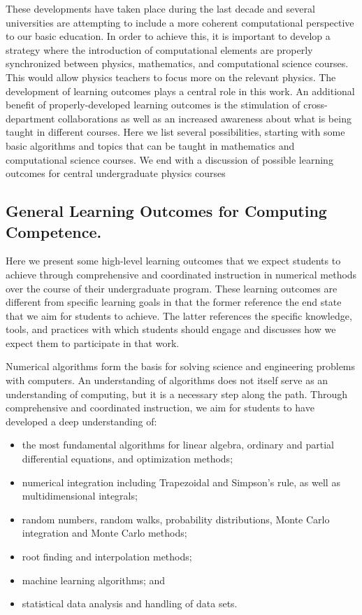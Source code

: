 \documentclass[graybox,envcountchap,sectrefs]{svmult}
\begin{document}
These developments have taken place during the last decade and several
universities are attempting to include a more coherent
computational perspective to our basic education. In order to achieve this, it is important to develop a
strategy where the introduction of computational elements are properly
synchronized between physics, mathematics, and computational science
courses. This would allow physics teachers to focus more on the relevant
physics. The development of learning outcomes plays a central role in this work.  An
additional benefit of properly-developed learning outcomes is the
stimulation of cross-department collaborations as well as an increased
awareness about what is being taught in different courses.  Here we
list several possibilities, starting with some basic algorithms and topics that
can be taught in mathematics and computational science courses. We end
with a discussion of possible learning outcomes for central
undergraduate physics courses




\subsection{General Learning Outcomes for Computing Competence.}

Here we present some high-level learning outcomes that we expect
students to achieve through comprehensive and coordinated instruction
in numerical methods over the course of their undergraduate
program. These learning outcomes are different from specific learning
goals in that the former reference the end state that we aim for
students to achieve. The latter references the specific knowledge,
tools, and practices with which students should engage and discusses
how we expect them to participate in that work.

Numerical algorithms form the basis for solving science and
engineering problems with computers. An understanding of algorithms
does not itself serve as an understanding of computing, but it is a
necessary step along the path. Through comprehensive and coordinated
instruction, we aim for students to have developed a deep understanding of:

\begin{itemize}
\item the most fundamental algorithms for linear algebra, ordinary and partial differential equations, and optimization methods;

\item numerical integration including Trapezoidal and Simpson's rule, as well as multidimensional integrals;

\item random numbers, random walks, probability distributions, Monte Carlo integration and Monte Carlo methods;

\item root finding and interpolation methods;

\item machine learning algorithms; and

\item statistical data analysis and handling of data sets.

\end{itemize}
\end{document}
